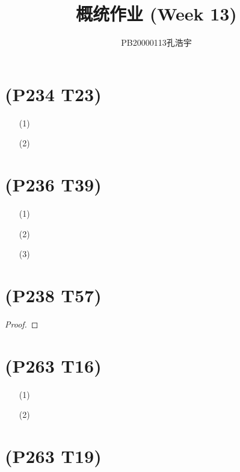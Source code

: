 \documentclass{article}
\title{概统作业 (Week 13)}
\author{PB20000113孔浩宇}
\begin{document}
\maketitle
\section{(P234 T23)}  %
\begin{enumerate}
    \item [(1)]
    \item [(2)]
\end{enumerate}


\section{(P236 T39)}  %
\begin{enumerate}
    \item [(1)]
    \item [(2)]
    \item [(3)]
\end{enumerate}


\section{(P238 T57)}  %
\begin{proof}
    
\end{proof}


\section{(P263 T16)}  %
\begin{enumerate}
    \item [(1)]
    \item [(2)]
\end{enumerate}


\section{(P263 T19)}  %
\end{document}
